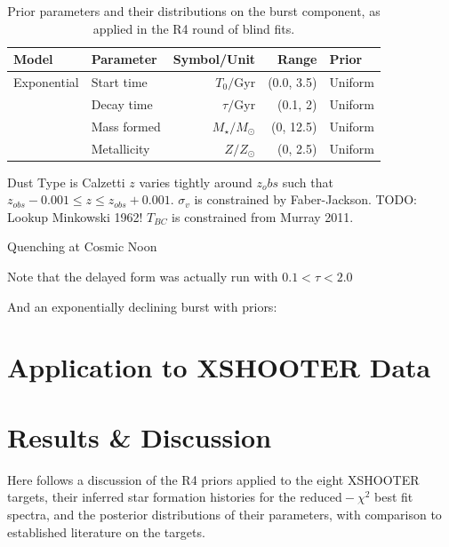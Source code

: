 \documentclass[a4paper,11pt]{article}
\begin{document}
\begin{table}
  \centering
  \begin{tabular}{l l r r l}
    Model       & Parameter            & Symbol/Unit                  & Range           & Prior   \\
    \hline \hline
    Exponential & Start time           & $T_0/\mathrm{Gyr}$           & (0.0, 3.5)      & Uniform \\ %
    & Decay time           & $\tau/\mathrm{Gyr}$          & (0.1, 2)        & Uniform \\
    & Mass formed          & $M_\star/M_\odot$            & (0, 12.5)       & Uniform \\
    & Metallicity          & $Z/Z_\odot$                  & (0, 2.5)        & Uniform \\
  \end{tabular}
  \caption{Prior parameters and their distributions on the burst component, as applied in the R4 round of blind fits.}
  \label{tab:r4_burst_priors}
\end{table}

Dust Type is Calzetti
$z$ varies tightly around $z_obs$ such that $z_{obs}-0.001 \leq z \leq z_{obs}+0.001$.
$\sigma_{v}$ is constrained by Faber-Jackson. TODO: Lookup Minkowski 1962!
$T_{BC}$ is constrained from Murray 2011.

Quenching at Cosmic Noon

Note that the delayed form was actually run with   $0.1 < \tau < 2.0$

And an exponentially declining burst with priors:

\section{Application to XSHOOTER Data}\label{sec:tde_fitting}
\section{Results \& Discussion}\label{sec:results_and_discussion}

Here follows a discussion of the R4 priors applied to the eight XSHOOTER targets, their inferred star formation histories for the $\mathrm{reduced-}\chi^2$ best fit spectra, and the posterior distributions of their parameters, with comparison to established literature on the targets.
\end{document}
